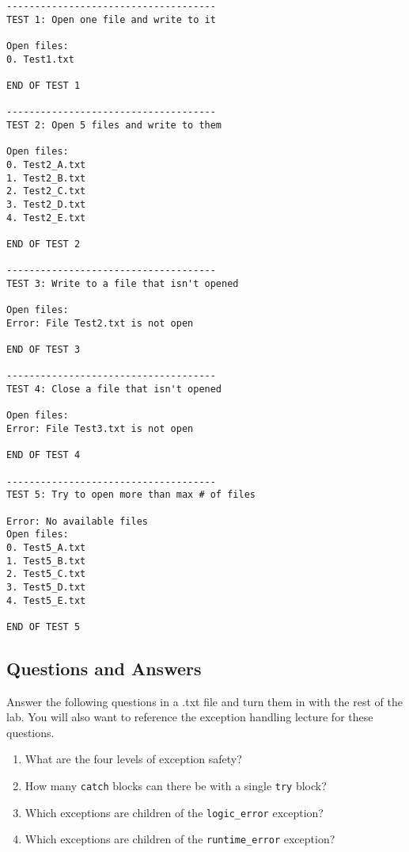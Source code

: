 \documentclass[a4paper,12pt]{book}
\begin{document}
\begin{lstlisting}[style=output]
-------------------------------------
TEST 1: Open one file and write to it

Open files: 
0. Test1.txt

END OF TEST 1

-------------------------------------
TEST 2: Open 5 files and write to them

Open files: 
0. Test2_A.txt
1. Test2_B.txt
2. Test2_C.txt
3. Test2_D.txt
4. Test2_E.txt

END OF TEST 2

-------------------------------------
TEST 3: Write to a file that isn't opened

Open files: 
Error: File Test2.txt is not open

END OF TEST 3

-------------------------------------
TEST 4: Close a file that isn't opened

Open files: 
Error: File Test3.txt is not open

END OF TEST 4

-------------------------------------
TEST 5: Try to open more than max # of files

Error: No available files
Open files: 
0. Test5_A.txt
1. Test5_B.txt
2. Test5_C.txt
3. Test5_D.txt
4. Test5_E.txt

END OF TEST 5
\end{lstlisting}

           
        \newpage
        \subsection*{Questions and Answers}
            Answer the following questions in a .txt file and
            turn them in with the rest of the lab.
            You will also want to reference the exception handling
            lecture for these questions.

            \begin{enumerate}
                \item What are the four levels of exception safety?
                \item How many \texttt{catch} blocks can there be
                    with a single \texttt{try} block?
                \item Which exceptions are children of the \texttt{logic\_error} exception?
                \item Which exceptions are children of the \texttt{runtime\_error} exception?
            \end{enumerate}
\end{document}
